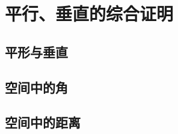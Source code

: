\section{平行、垂直的综合证明}
\subsection{平形与垂直}
\clearpage
\subsection{空间中的角}
\clearpage
\subsection{空间中的距离}
\clearpage

